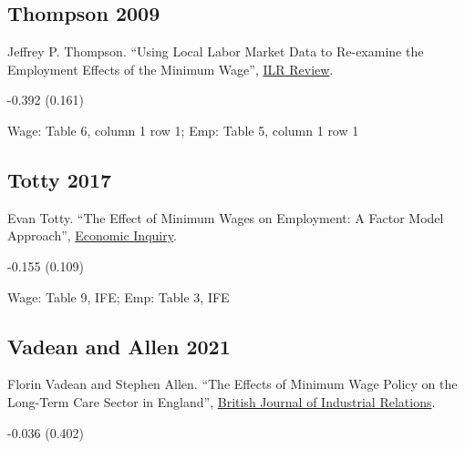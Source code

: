 \subsection*{Thompson 2009}
\vspace{-0.7em}

\noindent Jeffrey P. Thompson. ``Using Local Labor Market Data to Re-examine the Employment Effects of the Minimum Wage'', \href{https://doi.org/10.1177/001979390906200305}{ILR Review}.

\vspace{0.7em}

 -0.392 (0.161)

\vspace{0.7em}

 Wage: Table 6, column 1 row 1; Emp: Table 5, column 1 row 1

\subsection*{Totty 2017}
\vspace{-0.7em}

\noindent Evan Totty. ``The Effect of Minimum Wages on Employment: A Factor Model Approach'', \href{https://doi.org/10.1111/ecin.12472}{Economic Inquiry}.

\vspace{0.7em}

 -0.155 (0.109)

\vspace{0.7em}

 Wage: Table 9, IFE; Emp: Table 3, IFE

\subsection*{Vadean and Allen 2021}
\vspace{-0.7em}

\noindent Florin Vadean and Stephen Allen. ``The Effects of Minimum Wage Policy on the Long-Term Care Sector in England'', \href{https://doi.org/10.1111/bjir.12572}{British Journal of Industrial Relations}.

\vspace{0.7em}

 -0.036 (0.402)

\vspace{0.7em}

